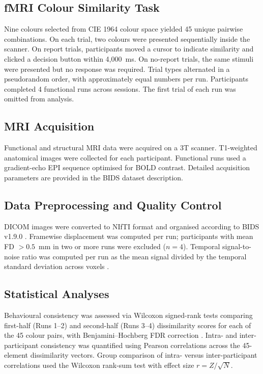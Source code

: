 \documentclass[11pt]{article}
\begin{document}
\subsection{fMRI Colour Similarity Task}
Nine colours selected from CIE 1964 colour space yielded 45 unique pairwise combinations. On each trial, two colours were presented sequentially inside the scanner. On report trials, participants moved a cursor to indicate similarity and clicked a decision button within 4,000~ms. On no-report trials, the same stimuli were presented but no response was required. Trial types alternated in a pseudorandom order, with approximately equal numbers per run. Participants completed 4 functional runs across sessions. The first trial of each run was omitted from analysis.

\subsection{MRI Acquisition}
Functional and structural MRI data were acquired on a 3T scanner. T1-weighted anatomical images were collected for each participant. Functional runs used a gradient-echo EPI sequence optimised for BOLD contrast. Detailed acquisition parameters are provided in the BIDS dataset description.

\subsection{Data Preprocessing and Quality Control}
DICOM images were converted to NIfTI format and organised according to BIDS v1.9.0 \citep{gorgolewski2016brain}. Framewise displacement \citep{power2012spurious} was computed per run; participants with mean FD $> 0.5$~mm in two or more runs were excluded ($n = 4$). Temporal signal-to-noise ratio was computed per run as the mean signal divided by the temporal standard deviation across voxels \citep{esteban2019mriqc}.

\subsection{Statistical Analyses}
Behavioural consistency was assessed via Wilcoxon signed-rank tests \citep{wilcoxon1945individual} comparing first-half (Runs 1--2) and second-half (Runs 3--4) dissimilarity scores for each of the 45 colour pairs, with Benjamini--Hochberg FDR correction \citep{benjamini1995controlling}. Intra- and inter-participant consistency was quantified using Pearson correlations across the 45-element dissimilarity vectors. Group comparison of intra- versus inter-participant correlations used the Wilcoxon rank-sum test with effect size $r = Z / \sqrt{N}$.
\end{document}
